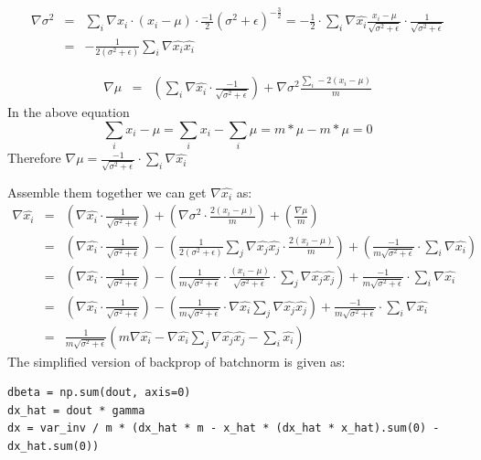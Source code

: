 \documentclass{article} %
\begin{document}
\begin{eqnarray*}
\nabla \sigma^2 &=& \sum_i \nabla \hat{x_i} \cdot (x_i - \mu) \cdot \frac{-1}{2} (\sigma^2 + \epsilon)^{-\frac{3}{2}} = -\frac{1}{2} \cdot \sum_i \nabla \hat{x_i} \frac{x_i-\mu}{\sqrt{\sigma^2+\epsilon}} \cdot \frac{1}{\sqrt{\sigma^2+\epsilon}}\\
&=& -\frac{1}{2(\sigma^2+\epsilon)} \sum_i \nabla \hat{x_i} \hat{x_i}
\end{eqnarray*}

\begin{eqnarray*}
\nabla \mu &=& \left(\sum_i \nabla \hat{x_i} \cdot \frac{-1}{\sqrt{\sigma^2+\epsilon}}\right) + \nabla{\sigma^2} \frac{\sum_i -2(x_i-\mu)}{m}
\end{eqnarray*}
In the above equation
$$\sum_i x_i - \mu = \sum_i x_i - \sum_i \mu =m*\mu - m * \mu=0$$
Therefore $\nabla \mu = \frac{-1}{\sqrt{\sigma^2+\epsilon}} \cdot \sum_i \nabla \hat{x_i}$

Assemble them together we can get $\nabla \hat{x_i}$ as:
\begin{eqnarray*}
	\nabla \hat{x_i} &=& \left(\nabla \hat{x_i} \cdot \frac{1}{\sqrt{\sigma^2 + \epsilon}}\right) + \left(\nabla \sigma^2 \cdot \frac{2(x_i-\mu)}{m}\right) + \left(\frac{\nabla{\mu}}{m}\right)\\
	&=& \left(\nabla \hat{x_i} \cdot \frac{1}{\sqrt{\sigma^2 + \epsilon}}\right) - \left(\frac{1}{2(\sigma^2+\epsilon)} \sum_j \nabla \hat{x_j} \hat{x_j} \cdot \frac{2(x_i-\mu)}{m}\right) + \left(\frac{-1}{m\sqrt{\sigma^2+\epsilon}} \cdot \sum_i \nabla \hat{x_i}\right)\\
	&=& \left(\nabla \hat{x_i} \cdot \frac{1}{\sqrt{\sigma^2 + \epsilon}}\right) - \left(\frac{1}{m\sqrt{\sigma^2 + \epsilon}} \cdot \frac{(x_i-\mu)}{\sqrt{\sigma^2+\epsilon}}\cdot \sum_j \nabla \hat{x_j} \hat{x_j}\right) + \frac{-1}{m\sqrt{\sigma^2+\epsilon}} \cdot \sum_i \nabla \hat{x_i}\\
	&=& \left(\nabla \hat{x_i} \cdot \frac{1}{\sqrt{\sigma^2 + \epsilon}}\right) - \left(\frac{1}{m\sqrt{\sigma^2 + \epsilon}} \cdot \nabla \hat{x_i} \sum_j \nabla \hat{x_j} \hat{x_j}\right) + \frac{-1}{m\sqrt{\sigma^2+\epsilon}} \cdot \sum_i \nabla \hat{x_i}\\
	&=& \frac{1}{m\sqrt{\sigma^2+\epsilon}}\left(m\nabla \hat{x_i} - \nabla \hat{x_i} \sum_j \nabla \hat{x_j} \hat{x_j} - \sum_i \hat{x_i}\right)
\end{eqnarray*}
The simplified version of backprop of batchnorm is given as:
\begin{lstlisting}
dbeta = np.sum(dout, axis=0)
dx_hat = dout * gamma
dx = var_inv / m * (dx_hat * m - x_hat * (dx_hat * x_hat).sum(0) - dx_hat.sum(0))
\end{lstlisting}
\end{document}

